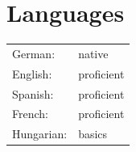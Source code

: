 \documentclass[11pt]{article}
\begin{document}
	\section*{Languages}
	\begin{tabularx}{\textwidth}{lX}
		German: & native \\
		English: & proficient \\
		Spanish: & proficient \\
		French: & proficient \\
		Hungarian: & basics 
	\end{tabularx}
	

	
\end{document}
